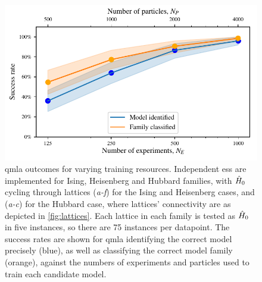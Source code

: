 \begin{figure}[t]
    \begin{center}
        \includegraphics{theoretical_study/figures/model_family_search.pdf}
    \end{center}
    \caption[QMLA outcomes for varying training resources]{
        \gls{qmla} outcomes for varying training resources. 
        Independent \glspl{es} are implemented for Ising, Heisenberg and Hubbard families, 
            with $\hat{H}_0$ cycling through lattices (\emph{a-f}) for the Ising and Heisenberg cases, 
            and (\emph{a-c}) for the Hubbard case, where lattices' connectivity are as depicted in \cref{fig:lattices}.
        Each lattice in each family is tested as $\hat{H}_0$ in five \glspl{instance}, so there are 75 \glspl{instance} per datapoint. 
        The success rates are shown for \gls{qmla} identifying the correct model precisely (blue),
            as well as classifying the correct model family (orange), 
            against the numbers of \glspl{experiment} and \glspl{particle} used to train each candidate model. 
        \figtableref
    }
    \label{fig:family_classification}
\end{figure}
